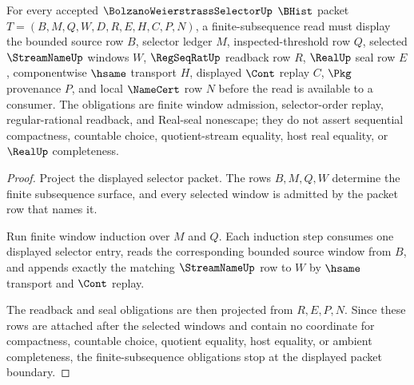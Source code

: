 \begin{theorem}
\label{thm:bolzanoweierstrassselector-finite-subsequence-obligations}
For every accepted $\BolzanoWeierstrassSelectorUp$ $\BHist$ packet $T=(B,M,Q,W,D,R,E,H,C,P,N)$, a finite-subsequence read must display the bounded source row $B$, selector ledger $M$, inspected-threshold row $Q$, selected $\StreamNameUp$ windows $W$, $\RegSeqRatUp$ readback row $R$, $\RealUp$ seal row $E$, componentwise $\hsame$ transport $H$, displayed $\Cont$ replay $C$, $\Pkg$ provenance $P$, and local $\NameCert$ row $N$ before the read is available to a consumer. The obligations are finite window admission, selector-order replay, regular-rational readback, and Real-seal nonescape; they do not assert sequential compactness, countable choice, quotient-stream equality, host real equality, or $\RealUp$ completeness.
\end{theorem}
\begin{proof}
Project the displayed selector packet. The rows $B,M,Q,W$ determine the finite subsequence surface, and every selected window is admitted by the packet row that names it.

Run finite window induction over $M$ and $Q$. Each induction step consumes one displayed selector entry, reads the corresponding bounded source window from $B$, and appends exactly the matching $\StreamNameUp$ row to $W$ by $\hsame$ transport and $\Cont$ replay.

The readback and seal obligations are then projected from $R,E,P,N$. Since these rows are attached after the selected windows and contain no coordinate for compactness, countable choice, quotient equality, host equality, or ambient completeness, the finite-subsequence obligations stop at the displayed packet boundary.
\end{proof}

